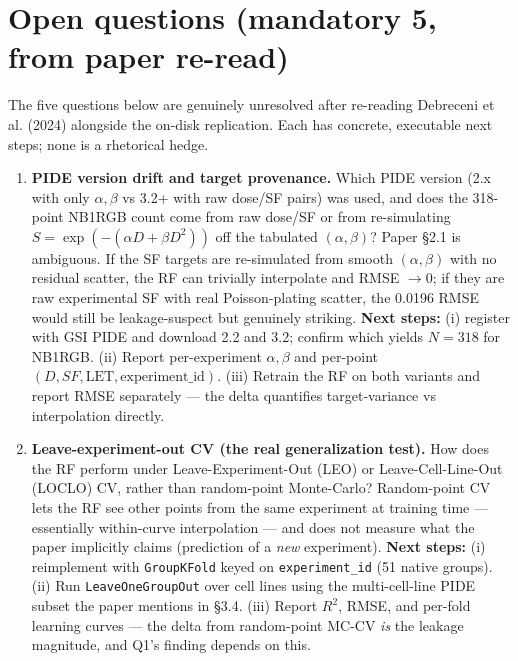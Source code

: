 \section{Open questions (mandatory 5, from paper re-read)}

The five questions below are genuinely unresolved after re-reading Debreceni et al. (2024) alongside the on-disk replication. Each has concrete, executable next steps; none is a rhetorical hedge.

\begin{enumerate}[leftmargin=*,label=\textbf{Q\arabic*.}]

\item \textbf{PIDE version drift and target provenance.} Which PIDE version (2.x with only $\alpha,\beta$ vs 3.2+ with raw dose/SF pairs) was used, and does the 318-point NB1RGB count come from raw dose/SF or from re-simulating $S = \exp(-(\alpha D + \beta D^2))$ off the tabulated $(\alpha,\beta)$? Paper \S 2.1 is ambiguous. If the SF targets are re-simulated from smooth $(\alpha,\beta)$ with no residual scatter, the RF can trivially interpolate and RMSE $\to 0$; if they are raw experimental SF with real Poisson-plating scatter, the 0.0196 RMSE would still be leakage-suspect but genuinely striking. \textbf{Next steps:} (i) register with GSI PIDE and download 2.2 and 3.2; confirm which yields $N=318$ for NB1RGB. (ii) Report per-experiment $\alpha,\beta$ and per-point $(D, SF, \mathrm{LET}, \mathrm{experiment\_id})$. (iii) Retrain the RF on both variants and report RMSE separately --- the delta quantifies target-variance vs interpolation directly.

\item \textbf{Leave-experiment-out CV (the real generalization test).} How does the RF perform under Leave-Experiment-Out (LEO) or Leave-Cell-Line-Out (LOCLO) CV, rather than random-point Monte-Carlo? Random-point CV lets the RF see other points from the same experiment at training time --- essentially within-curve interpolation --- and does not measure what the paper implicitly claims (prediction of a \emph{new} experiment). \textbf{Next steps:} (i) reimplement with \texttt{GroupKFold} keyed on \texttt{experiment\_id} (51 native groups). (ii) Run \texttt{LeaveOneGroupOut} over cell lines using the multi-cell-line PIDE subset the paper mentions in \S 3.4. (iii) Report $R^2$, RMSE, and per-fold learning curves --- the delta from random-point MC-CV \emph{is} the leakage magnitude, and Q1's finding depends on this.


\end{enumerate}
